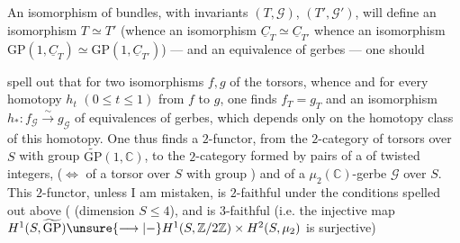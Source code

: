 An isomorphism of bundles, with invariants
$(T,\mathcal G)$, $(T',\mathcal G')$, will define an isomorphism $T\simeq T'$
(whence an isomorphism 
$\underline C_T\simeq\underline C_{T'}$ whence
an isomorphism $\mathrm{GP}(1,\underline C_T)\simeq\mathrm{GP}(1,\underline C_{T'})$) --- and
an equivalence of gerbes --- one should

spell out that for two isomorphisms
$f,g$ of the torsors,  whence
and for every homotopy $h_t$ $(0\leq t\leq1)$ from
$f$ to $g$, one finds $f_T=g_T$ and an
isomorphism $h_*:f_{\mathcal G}\xrightarrow{\sim}g_{\mathcal G}$ of equivalences of
gerbes, which depends only on the homotopy
class of this homotopy. One
thus finds a $2$-functor, from the
$2$-category of  torsors over $S$
with group $\widetilde{\mathrm{GP}}(1,\mathbb C)$, to the $2$-category
formed by pairs  of a
  of %
twisted integers,  ($\Longleftrightarrow$ of a torsor over
$S$ with group  ) and of a
 $\mu_2(\mathbb C)$-gerbe $\mathcal G$ over $S$. This
$2$-functor, unless I am mistaken, is $2$-faithful
under the conditions spelled out
above ( (dimension $S\leq4$), and
is $3$-faithful (i.e. the injective map
$H^1(S,\widetilde{\mathrm{GP}})\unsure{\longrightarrow|{-}}
H^1(S,\mathbb Z/2\mathbb Z)\times H^2(S,\mu_2)$ is surjective)

